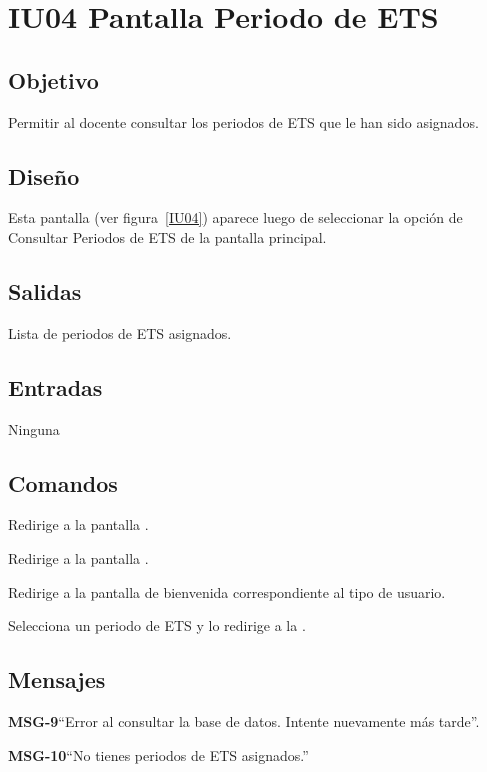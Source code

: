 \section{IU04 Pantalla Periodo de ETS}

\subsection{Objetivo}
	Permitir al docente consultar los periodos de ETS que le han sido asignados. 

\subsection{Diseño}
	Esta pantalla  (ver figura~\ref{IU04}) aparece luego de seleccionar la opción de Consultar Periodos de ETS de la pantalla principal. 


\subsection{Salidas}

	Lista de periodos de ETS asignados. 

\subsection{Entradas}
Ninguna

\subsection{Comandos}

\begin{Citemize}
	\item {} Redirige a la pantalla .
	\item {} Redirige a la pantalla .
	\item {} Redirige a la pantalla de bienvenida correspondiente al tipo de usuario.
	\item {} Selecciona un periodo de ETS y lo redirige a la . 
\end{Citemize}


\subsection{Mensajes}

\begin{Citemize}
	\item {\bf MSG-9}{``Error al consultar la base de datos. Intente nuevamente más tarde''.}
	\item {\bf MSG-10}{``No tienes periodos de ETS asignados.''}
\end{Citemize}

